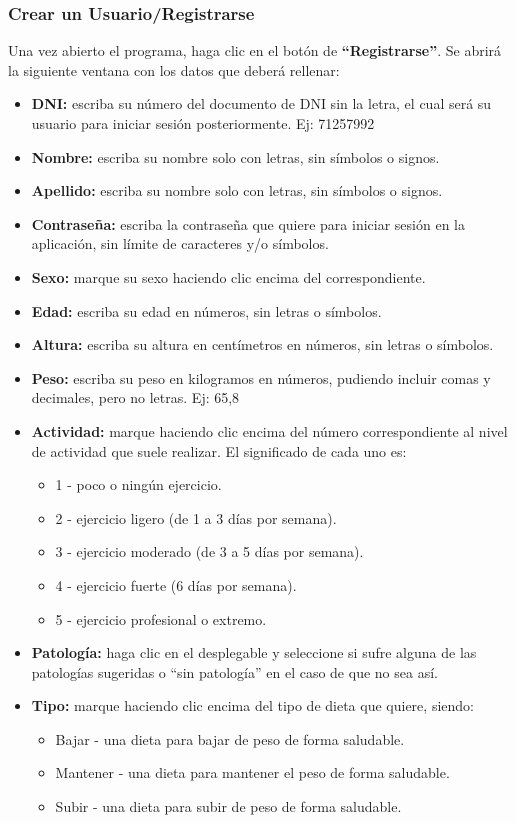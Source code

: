 \subsubsection{Crear un Usuario/Registrarse}
Una vez abierto el programa, haga clic en el botón de \textbf{“Registrarse”}. 
Se abrirá la siguiente ventana con los datos que deberá rellenar:
\begin{itemize}
\item	\textbf{DNI:} escriba su número del documento de DNI sin la letra, el cual será su usuario para iniciar sesión posteriormente. Ej: 71257992
\item	\textbf{Nombre:} escriba su nombre solo con letras, sin símbolos o signos.
\item	\textbf{Apellido:} escriba su nombre solo con letras, sin símbolos o signos.
\item	\textbf{Contraseña:} escriba la contraseña que quiere para iniciar sesión en la aplicación, sin límite de caracteres y/o símbolos.
\item	\textbf{Sexo:} marque su sexo haciendo clic encima del correspondiente.
\item	\textbf{Edad:} escriba su edad en números, sin letras o símbolos.
\item	\textbf{Altura:} escriba su altura en centímetros en números, sin letras o símbolos.
\item	\textbf{Peso:} escriba su peso en kilogramos en números, pudiendo incluir comas y decimales, pero no letras. Ej: 65,8
\item	\textbf{Actividad:} marque haciendo clic encima del número correspondiente al nivel de actividad que suele realizar. El significado de cada uno es:
\begin{itemize}
\item	1 - poco o ningún ejercicio.
\item	2 - ejercicio ligero (de 1 a 3 días por semana).
\item	3 - ejercicio moderado (de 3 a 5 días por semana).
\item	4 - ejercicio fuerte (6 días por semana).
\item	5 - ejercicio profesional o extremo.
\end{itemize}
\item	\textbf{Patología:} haga clic en el desplegable y seleccione si sufre alguna de las patologías sugeridas o “sin patología” en el caso de que no sea así.
\item	\textbf{Tipo:} marque haciendo clic encima del tipo de dieta que quiere, siendo:
\begin{itemize}
\item	Bajar - una dieta para bajar de peso de forma saludable.
\item	Mantener - una dieta para mantener el peso de forma saludable.
\item	Subir - una dieta para subir de peso de forma saludable.
\end{itemize}
\end{itemize}

